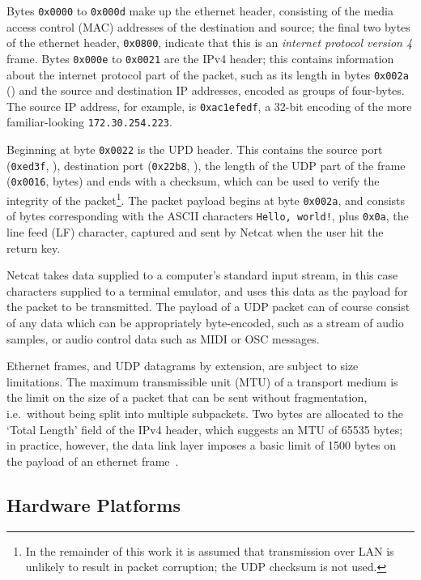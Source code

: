 Bytes \texttt{0x0000} to \texttt{0x000d} make up the ethernet header,
consisting of the media access control (MAC) addresses of the destination and
source; the final two bytes of the ethernet header, \texttt{0x0800}, indicate
that this is an \textit{internet protocol version 4} frame.
Bytes \texttt{0x000e} to \texttt{0x0021} are the IPv4 header; this contains
information about the internet protocol part of the packet, such as its length
in bytes \textemdash{} \texttt{0x002a} () \textemdash{} and
the source and destination IP addresses, encoded as groups of four-bytes.
The source IP address, for example, is \texttt{0xac1efedf}, a 32-bit encoding
of the more familiar-looking \texttt{172.30.254.223}.

Beginning at byte \texttt{0x0022} is the UPD header.
This contains the source port (\texttt{0xed3f}, ), destination
port (\texttt{0x22b8}, ), the length of the UDP part of the frame
(\texttt{0x0016},  bytes) and ends with a checksum, which
can be used to verify the integrity of the packet\footnote{
    In the remainder of this work it is assumed that transmission over LAN is
    unlikely to result in packet corruption; the UDP checksum is not used.
}.
The packet payload begins at byte \texttt{0x002a}, and consists of bytes
corresponding with the ASCII characters \texttt{Hello, world!}, plus
\texttt{0x0a}, the line feed (LF) character, captured and sent by Netcat when
the user hit the return key.

Netcat takes data supplied to a computer's standard input stream, in this
case characters supplied to a terminal emulator, and uses this data as the
payload for the packet to be transmitted.
The payload of a UDP packet can of course consist of any data which can be
appropriately byte-encoded, such as a stream of audio samples, or audio control
data such as MIDI or OSC messages.

Ethernet frames, and UDP datagrams by extension, are subject to size
limitations.
The maximum transmissible unit (MTU) of a transport medium is the limit on the
size of a packet that can be sent without fragmentation, i.e.\ without being
split into multiple subpackets.
Two bytes are allocated to the `Total Length' field of the IPv4 header, which
suggests an MTU of \num{65535} bytes; in practice, however, the data link layer
imposes a basic limit of \num{1500} bytes on the payload of an ethernet
frame~\citep{schiavoni_alternatives_2013,noauthor_ieee_2018}.


\subsection{Hardware Platforms}\label{subsec:hardware-platforms}

